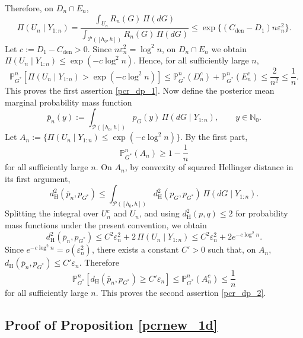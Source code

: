 \documentclass[twoside,12pt]{article}
\renewcommand{\P}{\mathds{P}}
\begin{document}
Therefore, on $D_n\cap E_n$,
\begin{displaymath}
\Pi(U_n\mid Y_{1:n})=\frac{\int_{U_n}R_n(G)\,\Pi(dG)}{\int_{\mathcal P([h_0,h])}R_n(G)\,\Pi(dG)}\le\exp\{(C_{\mathrm{den}}-D_1)n\varepsilon_n^2\}.
\end{displaymath}
Let $c:=D_1-C_{\mathrm{den}}>0$. Since $n\varepsilon_n^2=\log^2 n$, on $D_n\cap E_n$ we obtain $\Pi(U_n\mid Y_{1:n})\le\exp(-c\log^2 n)$. Hence, for all sufficiently large $n$,
\begin{displaymath}
\P_{G^\ast}^n\!\left[\Pi(U_n\mid Y_{1:n})>\exp(-c\log^2 n)\right]\le\P_{G^\ast}^n(D_n^c)+\P_{G^\ast}^n(E_n^c)\le\frac{2}{n^2}\le\frac{1}{n}.
\end{displaymath}
This proves the first assertion \eqref{pcr_dp_1}. Now define the posterior mean marginal probability mass function
\begin{displaymath}
\bar p_n(y):=\int_{\mathcal P([h_0,h])}p_G(y)\,\Pi(dG\mid Y_{1:n}),\qquad y\in\mathbb N_0.
\end{displaymath}
Let $A_n:=\{\Pi(U_n\mid Y_{1:n})\le \exp(-c\log^2 n)\}$. By the first part,
\begin{displaymath}
\P_{G^\ast}^n(A_n)\ge 1-\frac{1}{n}
\end{displaymath}
for all sufficiently large $n$. On $A_n$, by convexity of squared Hellinger distance in its first argument,
\begin{displaymath}
d_{\mathrm H}^2(\bar p_n,p_{G^\ast})\le\int_{\mathcal P([h_0,h])}d_{\mathrm H}^2(p_G,p_{G^\ast})\,\Pi(dG\mid Y_{1:n}).
\end{displaymath}
Splitting the integral over $U_n^c$ and $U_n$, and using $d_{\mathrm H}^2(p,q)\le 2$ for probability mass functions under the present convention, we obtain
\begin{displaymath}
d_{\mathrm H}^2(\bar p_n,p_{G^\ast})\le C^2\varepsilon_n^2+2\,\Pi(U_n\mid Y_{1:n})\le C^2\varepsilon_n^2+2e^{-c\log^2 n}.
\end{displaymath}
Since $e^{-c\log^2 n}=o(\varepsilon_n^2)$, there exists a constant $C'>0$ such that, on $A_n$, $d_{\mathrm H}(\bar p_n,p_{G^\ast})\le C'\varepsilon_n$. Therefore
\begin{displaymath}
\P_{G^\ast}^n\!\left[d_{\mathrm H}(\bar p_n,p_{G^\ast})\ge C'\varepsilon_n\right]\le\P_{G^\ast}^n(A_n^c)\le\frac{1}{n}
\end{displaymath}
for all sufficiently large $n$. This proves the second assertion \eqref{pcr_dp_2}.

\subsection{Proof of Proposition \ref{pcrnew_1d}}\label{proof:pcrnew_1d}
\end{document}
